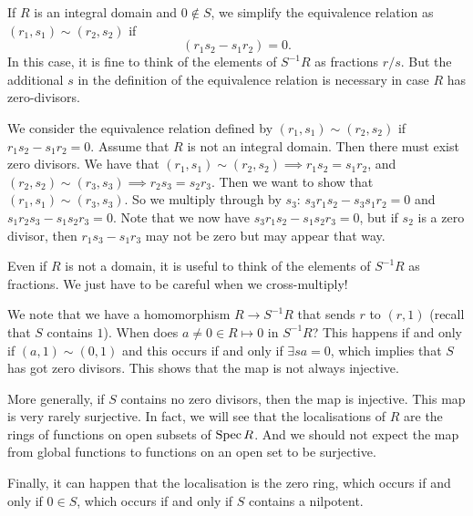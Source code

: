     If \(R\) is an integral domain and \(0 \not \in S\),  we simplify the equivalence relation as $(r_1,s_1)\sim(r_2,s_2)$ if
    \begin{equation}\label{eqn:olddef}
      (r_1s_2-s_1r_2)=0.
    \end{equation}
    In this case, it is fine to think of the elements of \(S^{-1}R\) as fractions \(r/s\).
    But the additional \(s\) in the definition of the equivalence relation is necessary in case \(R\) has zero-divisors.
    \begin{example}
        We consider the equivalence relation defined by $(r_1,s_1)\sim(r_2,s_2)$ if $r_1s_2-s_1r_2=0$.
        Assume that $R$ is not an integral domain. Then there must exist zero divisors.
        We have that $(r_1,s_1)\sim(r_2,s_2)\implies r_1s_2=s_1r_2$, and $(r_2,s_2)\sim(r_3,s_3)\implies r_2s_3=s_2r_3$.
        Then we want to show that $(r_1,s_1)\sim(r_3,s_3)$.
        So we multiply through by $s_3$: $s_3r_1s_2-s_3s_1r_2=0$ and $s_1r_2s_3-s_1s_2r_3=0$.
        Note that we now have $s_3r_1s_2-s_1s_2r_3=0$, but if $s_2$ is a zero divisor, then $r_1s_3-s_1r_3$ may not be zero but may appear that way.
      \end{example}

      Even if \(R\) is not a domain, it is useful to think of the elements of \(S^{-1}R\) as fractions.
      We just have to be careful when we cross-multiply!

    We note that we have a homomorphism $R\to S^{-1}R$ that sends \(r\) to \((r,1)\) (recall that $S$ contains \(1\)).
    When does $a\neq0\in R\mapsto0$ in $S^{-1}R$?
    This happens if and only if $(a,1)\sim(0,1)$ and this occurs if and only if $\exists sa=0$, which implies that $S$ has got zero divisors.
    This shows that the map is not always injective.

    More generally, if $S$ contains no zero divisors, then the map is injective.
    This map is very rarely surjective.
    In fact, we will see that the localisations of \(R\) are the rings of functions on open subsets of \(\operatorname{Spec} R\).
    And we should not expect the map from global functions to functions on an open set to be surjective.  
    
    Finally, it can happen that the localisation is the zero ring, which occurs if and only if $0\in S$, which occurs if and only if $S$ contains a nilpotent.

